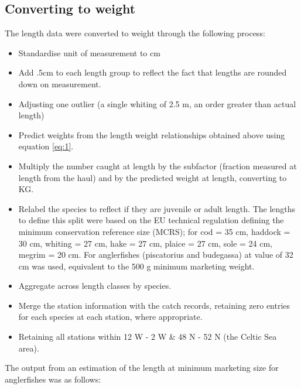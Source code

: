\documentclass[12pt]{article}\usepackage[]{graphicx}\usepackage[]{color}
\begin{document}
\subsection{Converting to weight}

The length data were converted to weight through the following process:

\begin{itemize}
	\item Standardise unit of measurement to cm
	\item Add .5cm to each length group to reflect the fact that lengths
		are rounded down on measurement.
	\item Adjusting one outlier (a single whiting of 2.5 m, an order
		greater than actual length) 
	\item Predict weights from the length weight relationships obtained
		above using equation \ref{eq:1}.
	\item Multiply the number caught at length by the subfactor (fraction
		measured at length from the haul) and by the predicted weight
		at length, converting to KG.
	\item Relabel the species to reflect if they are juvenile or adult
		length. The lengths to define this split were based on the EU
		technical regulation defining the minimum conservation
		reference size (MCRS); for cod = 35 cm, haddock = 30 cm,
		whiting = 27 cm, hake = 27 cm, plaice = 27 cm, sole = 24 cm,
		megrim = 20 cm. For anglerfishes (piscatorius and budegassa) at
		value of 32 cm was used, equivalent to the 500 g minimum
		marketing weight.
	\item Aggregate across length classes by species.
	\item Merge the station information with the catch records, retaining
		zero entries for each species at each station, where
		appropriate.
	\item Retaining all stations within 12 W - 2 W \&  48 N - 52 N (the
		Celtic Sea area).
\end{itemize}

The output from an estimation of the length at minimum marketing size for
anglerfishes was as follows:
\end{document}
